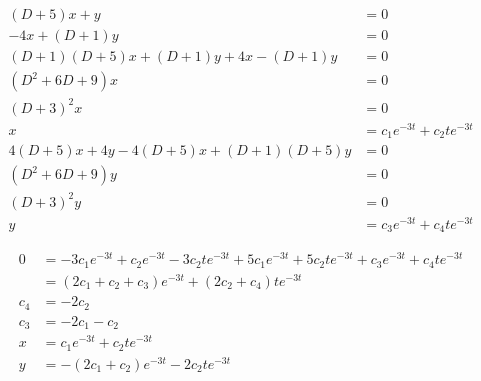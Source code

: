 \documentclass{article}
\begin{document}
\begin{align*}
  (D + 5) x + y                                       & = 0                             \\
  -4 x + (D + 1) y                                    & = 0                             \\
  (D + 1) (D + 5) x + (D + 1) y + 4 x - (D + 1) y     & = 0                             \\
  (D^2 + 6 D + 9) x                                   & = 0                             \\
  (D + 3)^2 x                                         & = 0                             \\
  x                                                   & = c_1 e^{-3 t} + c_2 t e^{-3 t} \\
  4 (D + 5) x + 4 y - 4 (D + 5) x + (D + 1) (D + 5) y & = 0                             \\
  (D^2 + 6 D + 9) y                                   & = 0                             \\
  (D + 3)^2 y                                         & = 0                             \\
  y                                                   & = c_3 e^{-3 t} + c_4 t e^{-3 t}
\end{align*}

\begin{align*}
  0   & = -3 c_1 e^{-3 t} + c_2 e^{-3 t} - 3 c_2 t e^{-3 t} + 5 c_1 e^{-3 t} + 5 c_2 t e^{-3 t} + c_3 e^{-3 t} + c_4 t e^{-3 t} \\
      & = (2 c_1 + c_2 + c_3) e^{-3 t} + (2 c_2 + c_4) t e^{-3 t}                                                               \\
  c_4 & = -2 c_2                                                                                                                \\
  c_3 & = -2 c_1 - c_2                                                                                                          \\
  x   & = c_1 e^{-3 t} + c_2 t e^{-3 t}                                                                                         \\
  y   & = -(2 c_1 + c_2) e^{-3 t} - 2 c_2 t e^{-3 t}
\end{align*}
\end{document}
